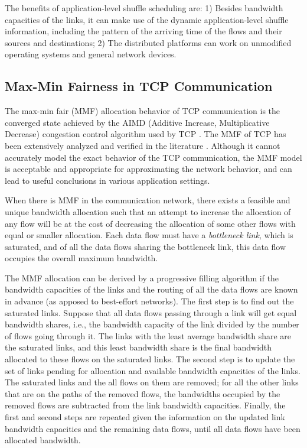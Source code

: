 \documentclass[10pt,journal,compsoc]{IEEEtran}
\begin{document}
The benefits of application-level shuffle scheduling are: 1) Besides bandwidth capacities of the links, 
it can make use of 
the dynamic application-level shuffle information, including the pattern of the 
arriving time of the flows and their sources and destinations; 
2) The distributed platforms can work on unmodified operating systems and general network devices. 



\subsection{Max-Min Fairness in TCP Communication}\label{section:MMF}
The max-min fair (MMF) allocation behavior of TCP communication %
is the converged state achieved by the 
AIMD (Additive Increase, Multiplicative Decrease) congestion control
algorithm used by TCP \cite{jacobson1988congestion}.
The MMF of TCP has been extensively
analyzed and verified in the literature \cite{bertsekas1992data, chiu1989analysis, kelly1998rate, vojnovic2000global}.
Although it cannot accurately model the exact behavior of the TCP
communication, the MMF model is acceptable and appropriate for
approximating the network behavior, and can lead to useful conclusions in
various application settings.
 
When there is MMF in the communication network, there
exists a feasible and unique bandwidth allocation
such that an attempt to increase the allocation of any flow will be
at the cost of decreasing the allocation of some other
flows with equal or smaller allocation.
Each data flow must have a \emph{bottleneck link}, which is saturated, 
and of all the data flows sharing the bottleneck link, this data flow
occupies the overall maximum bandwidth.

The MMF allocation can be derived by a progressive filling
algorithm if the bandwidth capacities of the links and the routing of all the data flows
are known in advance (as apposed to best-effort networks). 
The first step is to find out the saturated links.
Suppose that all data flows passing through a link will get equal
bandwidth shares,
i.e., the bandwidth capacity of the link divided by the number of
flows going through it. 
The links with the least average bandwidth share are the saturated links,
and this least bandwidth share is the final bandwidth allocated to these
flows on the saturated links.
The second step is to update the set of links pending for allocation 
and available bandwidth capacities of the links.
The saturated links and the all flows on them are removed; 
for all the other links that are on the paths of the removed flows, 
the bandwidths occupied by the removed flows are subtracted
from the link bandwidth capacities. 
Finally, the first and second steps are repeated given the information on 
the updated link bandwidth capacities
and the remaining data flows, until all data flows have been allocated
bandwidth.
\end{document}
